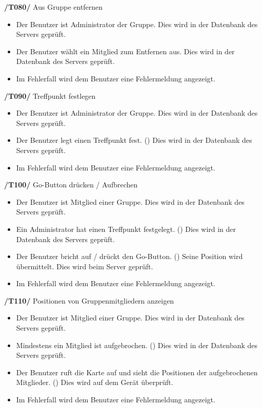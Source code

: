 \begin{itemize}
\begin{itemize}
\begin{itemize}
\begin{itemize}
\textbf{/T080/} Aus Gruppe entfernen \\
\begin{itemize}
\setlength{\itemsep}{0pt}
\item Der Benutzer ist Administrator der Gruppe. Dies wird in der Datenbank des Servers geprüft.
\item Der Benutzer wählt ein Mitglied zum Entfernen aus. Dies wird in der Datenbank des Servers geprüft.
\item Im Fehlerfall wird dem Benutzer eine Fehlermeldung angezeigt.
\end{itemize}


\textbf{/T090/} Treffpunkt festlegen \\
\begin{itemize}
\setlength{\itemsep}{0pt}
\item Der Benutzer ist Administrator der Gruppe. Dies wird in der Datenbank des Servers geprüft.
\item Der Benutzer legt einen Treffpunkt fest. () Dies wird in der Datenbank des Servers geprüft.
\item Im Fehlerfall wird dem Benutzer eine Fehlermeldung angezeigt.
\end{itemize}


\textbf{/T100/} Go-Button drücken / Aufbrechen \\ %
\begin{itemize}
\setlength{\itemsep}{0pt}
\item Der Benutzer ist Mitglied einer Gruppe. Dies wird in der Datenbank des Servers geprüft.
\item Ein Administrator hat einen Treffpunkt festgelegt. () Dies wird in der Datenbank des Servers geprüft.
\item Der Benutzer bricht auf / drückt den Go-Button. ()
Seine Position wird übermittelt.
Dies wird beim Server geprüft.
\item Im Fehlerfall wird dem Benutzer eine Fehlermeldung angezeigt.
\end{itemize}


\textbf{/T110/} Positionen von Gruppenmitgliedern anzeigen \\
\begin{itemize}
\setlength{\itemsep}{0pt}
\item Der Benutzer ist Mitglied einer Gruppe. Dies wird in der Datenbank des Servers geprüft.
\item Mindestens ein Mitglied ist aufgebrochen. () Dies wird in der Datenbank des Servers geprüft.
\item Der Benutzer ruft die Karte auf und sieht die Positionen der
aufgebrochenen Mitglieder. () Dies wird auf dem Gerät überprüft.
\item Im Fehlerfall wird dem Benutzer eine Fehlermeldung angezeigt.
\end{itemize}



\end{itemize}
\end{itemize}
\end{itemize}
\end{itemize}
